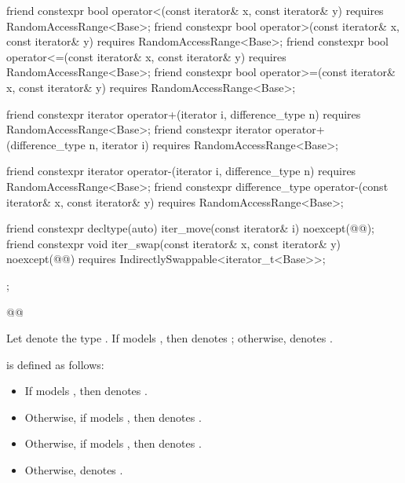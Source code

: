 \begin{codeblock}
{{    friend constexpr bool operator<(const iterator& x, const iterator& y)
      requires RandomAccessRange<Base>;
    friend constexpr bool operator>(const iterator& x, const iterator& y)
      requires RandomAccessRange<Base>;
    friend constexpr bool operator<=(const iterator& x, const iterator& y)
      requires RandomAccessRange<Base>;
    friend constexpr bool operator>=(const iterator& x, const iterator& y)
      requires RandomAccessRange<Base>;

    friend constexpr iterator operator+(iterator i, difference_type n)
      requires RandomAccessRange<Base>;
    friend constexpr iterator operator+(difference_type n, iterator i)
      requires RandomAccessRange<Base>;

    friend constexpr iterator operator-(iterator i, difference_type n)
      requires RandomAccessRange<Base>;
    friend constexpr difference_type operator-(const iterator& x, const iterator& y)
      requires RandomAccessRange<Base>;

    friend constexpr decltype(auto) iter_move(const iterator& i)
      noexcept(@\oldtxt{\seebelow}@);
    friend constexpr void iter_swap(const iterator& x, const iterator& y)
      noexcept(@\oldtxt{\seebelow}@)
      requires IndirectlySwappable<iterator_t<Base>>;
  };
}@\oldtxt{\}}@
\end{codeblock}

{\color{newclr}
\pnum
Let  denote the type
. If 
models , then
 denotes ; otherwise,
 denotes .

\pnum
{} is defined as follows:
\begin{itemize}
\item If  models , then
 denotes .

\item Otherwise, if  models , then
 denotes .

\item Otherwise, if  models , then
 denotes .

\item Otherwise,  denotes .
\end{itemize}
} %

